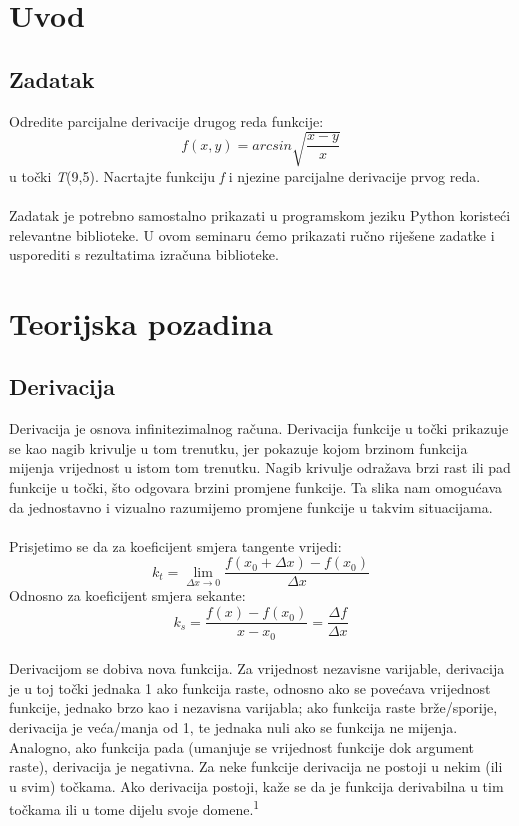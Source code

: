 \documentclass{article}
\begin{document}
\tableofcontents

\pagebreak

\section{Uvod}

\subsection{Zadatak}
Odredite parcijalne derivacije drugog reda funkcije:
$$
f(x,y) = arcsin \sqrt{\frac{x-y}{x}}
$$
u točki \textit{T}(9,5). Nacrtajte funkciju \textit{f} i njezine parcijalne derivacije prvog reda.
\\~\\
Zadatak je potrebno samostalno prikazati u programskom jeziku Python koristeći relevantne biblioteke. U ovom seminaru ćemo prikazati ručno riješene zadatke i usporediti s rezultatima izračuna biblioteke.

\pagebreak

\section{Teorijska pozadina}

\subsection{Derivacija}

Derivacija je osnova infinitezimalnog računa. Derivacija funkcije u točki prikazuje se kao nagib krivulje u tom trenutku, jer pokazuje kojom brzinom funkcija mijenja vrijednost u istom tom trenutku. Nagib krivulje odražava brzi rast ili pad funkcije u točki, što odgovara brzini promjene funkcije. Ta slika nam omogućava da jednostavno i vizualno razumijemo promjene funkcije u takvim situacijama.
\\~\\
Prisjetimo se da za koeficijent smjera tangente vrijedi:
\begin{equation*}
    k_t = \lim\limits_{\Delta x \rightarrow 0} \frac{f(x_0 + \Delta x)-f(x_0)}{\Delta x}
\end{equation*}
Odnosno za koeficijent smjera sekante:
\begin{equation*}
    k_s = \frac{f(x)-f(x_0)}{x - x_0} = \frac{\Delta f}{\Delta x}
\end{equation*}
\\
Derivacijom se dobiva nova funkcija. Za vrijednost nezavisne varijable, derivacija je u toj točki jednaka 1 ako funkcija raste, odnosno ako se povećava vrijednost funkcije, jednako brzo kao i nezavisna varijabla; ako funkcija raste brže/sporije, derivacija je veća/manja od 1, te jednaka nuli ako se funkcija ne mijenja. Analogno, ako funkcija pada (umanjuje se vrijednost funkcije dok argument raste), derivacija je negativna. Za neke funkcije derivacija ne postoji u nekim (ili u svim) točkama. Ako derivacija postoji, kaže se da je funkcija derivabilna u tim točkama ili u tome dijelu svoje domene.\textsuperscript{1}
\\~\\
\end{document}
